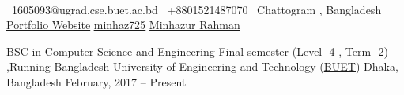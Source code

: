 \documentclass[]{awesome-cv}
\begin{document}
    
\begin{center}
	  \\
	\vspace{2mm}
	{\faEnvelope\ 1605093@ugrad.cse.buet.ac.bd} \hspace{5mm} {\faMobile\ +8801521487070}  \hspace{5mm} {\faMapMarker\ Chattogram , Bangladesh} \hspace{5mm} {\faLink\href{www.minhazrahman.com}{\underline{Portfolio Website}}}  {\faGithub \href{https://github.com/minhaz725}{\underline{minhaz725}}} \hspace{5mm} {\faLinkedin \href{https://www.linkedin.com/in/minhaz725/}{\underline{Minhazur Rahman}}}
\end{center}
\begin{cventries}
	\cventry
	{BSC in Computer Science and Engineering \newline Final semester (Level -4 , Term -2) ,Running }
	{Bangladesh University of Engineering and Technology (\href{https://www.buet.ac.bd/}{\underline{BUET}})}
	{Dhaka, Bangladesh}
	{February, 2017 – Present}
	{}
\end{cventries}

\vspace{-4mm}
\end{document}
